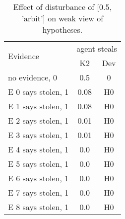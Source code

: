 \begin{table}\begin{tabular}{l|cc}\toprule\multirow{2}{*}{Evidence} & \multicolumn{2}{c}{agent steals}\\& {K2} & {Dev}\\\midrule
no evidence, 0 & \cellcolor{Bittersweet}0.5&\cellcolor{Bittersweet}0\\E 0 says stolen, 1 & \cellcolor{Bittersweet}0.08&\cellcolor{Bittersweet}H0\\E 1 says stolen, 1 & \cellcolor{Bittersweet}0.08&\cellcolor{Bittersweet}H0\\E 2 says stolen, 1 & \cellcolor{Bittersweet}0.01&\cellcolor{Bittersweet}H0\\E 3 says stolen, 1 & \cellcolor{Bittersweet}0.01&\cellcolor{Bittersweet}H0\\E 4 says stolen, 1 & \cellcolor{Bittersweet}0.0&\cellcolor{Bittersweet}H0\\E 5 says stolen, 1 & \cellcolor{Bittersweet}0.0&\cellcolor{Bittersweet}H0\\E 6 says stolen, 1 & \cellcolor{Bittersweet}0.0&\cellcolor{Bittersweet}H0\\E 7 says stolen, 1 & \cellcolor{Bittersweet}0.0&\cellcolor{Bittersweet}H0\\E 8 says stolen, 1 & \cellcolor{Bittersweet}0.0&\cellcolor{Bittersweet}H0\\\bottomrule\end{tabular}\caption{Effect of disturbance of [0.5, 'arbit'] on weak view of hypotheses.}\end{table}